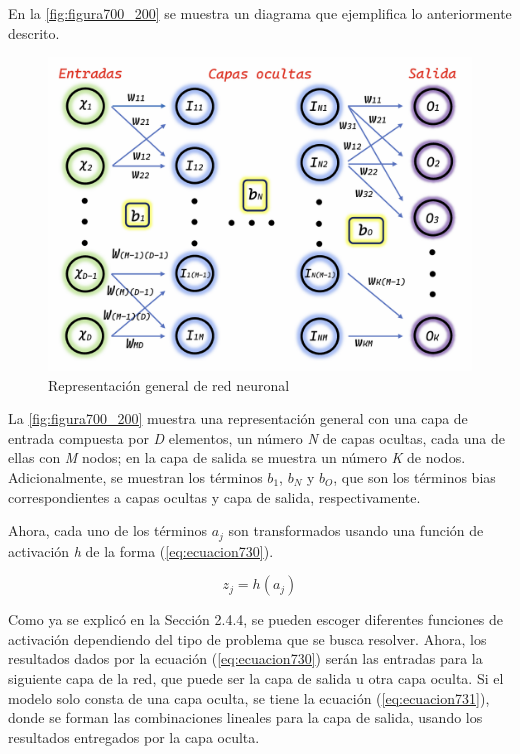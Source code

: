 {En la \autoref{fig:figura700_200} se muestra un diagrama que ejemplifica lo anteriormente descrito.

\clearpage

\begin{figure}[h]
\centering
  \includegraphics[scale=0.8]{imgss222.png}
  \caption{Representación general de red neuronal}
  \label{fig:figura700_200}
\end{figure}

La \autoref{fig:figura700_200} muestra una representación general con una capa de entrada compuesta por \textit{D} elementos, un número \textit{N} de capas ocultas, cada una de ellas con \textit{M} nodos; en la capa de salida 
se muestra un número \textit{K} de nodos. Adicionalmente, se muestran los términos \textit{$b_1$}, \textit{$b_N$} y \textit{$b_O$}, que son los términos bias correspondientes a capas ocultas y capa de salida, respectivamente. 

Ahora, cada uno de los términos \textit{$a_j$} son transformados usando una función de activación \textit{h} de la forma (\ref{eq:ecuacion730}).

\begin{equation}
	z_j=h(a_j)
	\label{eq:ecuacion730}
\end{equation}

Como ya se explicó en la Sección 2.4.4, se pueden escoger diferentes funciones de activación dependiendo del tipo de problema que se busca resolver. Ahora, los resultados dados por la ecuación (\ref{eq:ecuacion730}) serán 
las entradas para la siguiente capa de la red, que puede ser la capa de salida u otra capa oculta. Si el modelo solo consta de una capa oculta, se tiene la ecuación (\ref{eq:ecuacion731}), donde se forman las combinaciones 
lineales para la capa de salida, usando los resultados entregados por la capa oculta.

}
